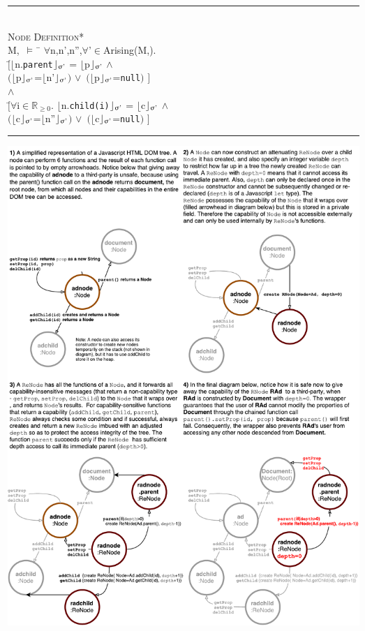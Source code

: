 \documentclass[a4paper,11pt, twoside,twocolumn]{article}
\newenvironment{logic}
{\begin{minipage}[c]{\linewidth}  \small \vspace{0.5em}\begin{tabbing}}
{\end{tabbing}\end{minipage}\vspace{0.5em}}
\newcommand{\loin}{$\in$}
\newcommand{\loforall}{$\forall$}
\newcommand{\loand}{$\land$}
\newcommand{\loor} {$\lor$}
\newcommand{\losigma}{\text{$\upsigma$}}
\newcommand{\loturns} {$\vDash$}
\newcommand{\loexec}[2] {$\lfloor$#1$\rfloor _{\text{#2}}$}
\newcommand{\hr}{\rule{\linewidth}{0.4pt}}
\begin{document}
\begin{logic} 
\hr\\
\textsc{\normalsize *Node Definition*}\\
M,\losigma\ \loturns\ \= \loforall n,n',n'',\loforall \losigma'\loin Arising(M,\losigma).\\
\>$[$\=\loexec{n.\texttt{parent}}{\losigma'} = \loexec{p}{\losigma'} \loand \\
\>\>$($\loexec{p}{\losigma'}=\loexec{n'}{\losigma'}$)$ \loor\ $($\loexec{p}{\losigma'}=\texttt{null}$)$ $]$\\
\>\loand \\
\>$[$\=\loforall i\loin$\mathbb{R}_{\geq 0}$. \loexec{n.\texttt{child(i)}}{\losigma'} = \loexec{c}{\losigma'} \loand \\
\>\>$($\loexec{c}{\losigma'}=\loexec{n''}{\losigma'}$)$ \loor\ $($\loexec{c}{\losigma'}=\texttt{null}$)$ $]$\\
\hr
\end{logic}
\newpage
\noindent%
\begin{minipage}{\textwidth}
\centering
\includegraphics[width=1.05\textwidth]{figures/DOM.pdf}
  \label{DOM example}
\end{minipage}
\newpage\null\newpage
\end{document}
